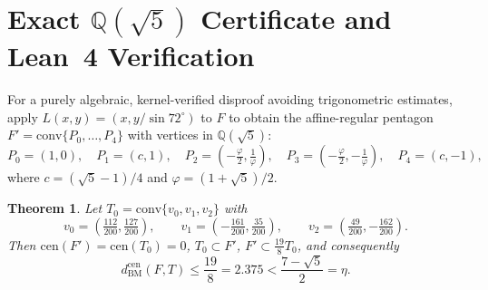 \documentclass[11pt]{article}
\newtheorem{theorem}{Theorem}
\begin{document}
\section{Exact $\mathbb{Q}(\sqrt{5})$ Certificate and Lean~4 Verification}

For a purely algebraic, kernel-verified disproof avoiding trigonometric
estimates, apply $L(x, y) = (x, y/\sin 72^\circ)$ to $F$ to obtain the
affine-regular pentagon $F' = \mathrm{conv}\{P_0, \dots, P_4\}$ with vertices in
$\mathbb{Q}(\sqrt{5})$:
\[
P_0 = (1, 0),\quad P_1 = (c, 1),\quad P_2 = (-\tfrac{\varphi}{2}, \tfrac{1}{\varphi}),\quad
P_3 = (-\tfrac{\varphi}{2}, -\tfrac{1}{\varphi}),\quad P_4 = (c, -1),
\]
where $c = (\sqrt{5} - 1)/4$ and $\varphi = (1 + \sqrt{5})/2$.

\begin{theorem}\label{thm:cert}
Let $T_0 = \mathrm{conv}\{v_0, v_1, v_2\}$ with
\[
v_0 = \left(\tfrac{112}{200}, \tfrac{127}{200}\right),\qquad
v_1 = \left(-\tfrac{161}{200}, \tfrac{35}{200}\right),\qquad
v_2 = \left(\tfrac{49}{200}, -\tfrac{162}{200}\right).
\]
Then $\mathrm{cen}(F') = \mathrm{cen}(T_0) = 0$, $T_0 \subset F'$,
$F' \subset \frac{19}{8} T_0$, and consequently
\[
d_{\mathrm{BM}}^{\mathrm{cen}}(F, T) \le \frac{19}{8} = 2.375
< \frac{7 - \sqrt{5}}{2} = \eta.
\]
\end{theorem}
\end{document}
